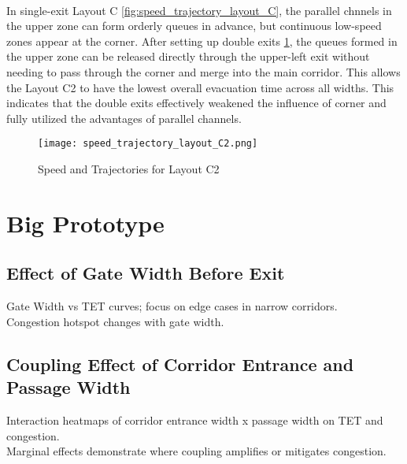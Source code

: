 \\In single-exit Layout C \ref{fig:speed_trajectory_layout_C}, the parallel chnnels in the upper zone can form orderly queues in advance, but continuous low-speed zones appear at the corner. After setting up double exits \ref{fig:speed_trajectory_layout_C2}, the queues formed in the upper zone can be released directly through the upper-left exit without needing to pass through the corner and merge into the main corridor. This allows the Layout C2 to have the lowest overall evacuation time across all widths. This indicates that the double exits effectively weakened the influence of corner and fully utilized the advantages of parallel channels.
\begin{figure}[h]
    \texttt{[image: speed\_trajectory\_layout\_C2.png]}
    \caption{Speed and Trajectories for Layout C2}\label{fig:speed_trajectory_layout_C2}
\end{figure}

\section{Big Prototype}

\subsection{Effect of Gate Width Before Exit}
Gate Width vs TET curves; focus on edge cases in narrow corridors.
\\Congestion hotspot changes with gate width.
\subsection{Coupling Effect of Corridor Entrance and Passage Width}
Interaction heatmaps of corridor entrance width x passage width on TET and congestion.
\\Marginal effects demonstrate where coupling amplifies or mitigates congestion.